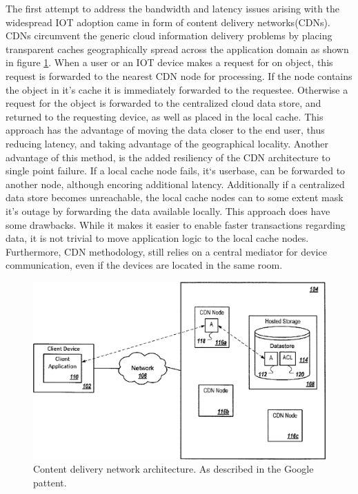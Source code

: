 The first attempt to address the bandwidth and latency issues arising with the widespread IOT adoption came in form of content delivery networks(CDNs).\cite{gagliardi2011content} CDNs circumvent the generic cloud information delivery problems by placing transparent caches geographically spread across the application domain as shown in figure \ref{lit:fig:2}. When a user or an IOT device makes a request for on object, this request is forwarded to the nearest CDN node for processing. If the node contains the object in it's cache it is immediately forwarded to the requestee. Otherwise a request for the object is forwarded to the centralized cloud data store, and returned to the requesting device, as well as placed in the local cache. This approach has the advantage of moving the data closer to the end user, thus reducing latency, and taking advantage of the geographical locality. Another advantage of this method, is the added resiliency of the CDN architecture to single point failure. If a local cache node fails, it`s userbase, can be forwarded to another node, although encoring additional latency. Additionally if a centralized data store becomes unreachable, the local cache nodes can to some extent mask it's outage by forwarding the data available locally. This approach does have some drawbacks. While it makes it easier to enable faster transactions regarding data, it is not trivial to move application logic to the local cache nodes. Furthermore, CDN methodology, still relies on a central mediator for device communication, even if the devices are located in the same room. 

\begin{figure}[h]
	\centering
	\includegraphics[width=0.6\linewidth]{img/cdn.png}	
	\caption{Content delivery network architecture. As described in the Google pattent.\cite{gagliardi2011content}}
	\label{lit:fig:2}
\end{figure}

